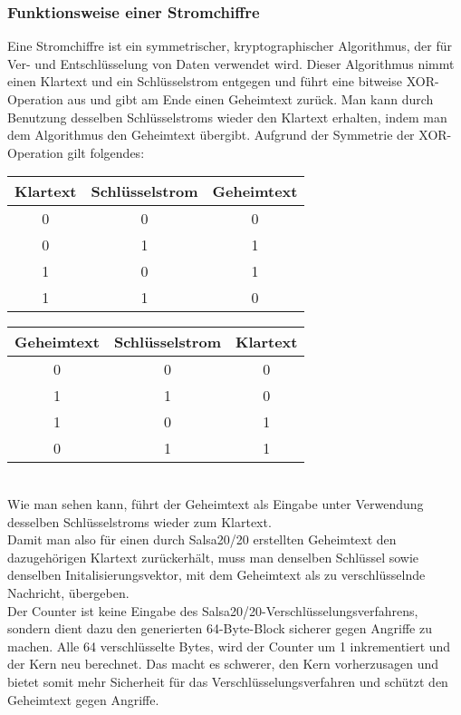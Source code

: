 \documentclass[course=erap]{aspdoc}
\begin{document}
\subsubsection{Funktionsweise einer Stromchiffre} \label{streamcipher}
Eine Stromchiffre ist ein symmetrischer, kryptographischer Algorithmus, der für Ver- und Entschlüsselung von Daten verwendet wird.
Dieser Algorithmus nimmt einen Klartext und ein Schlüsselstrom entgegen und führt eine bitweise XOR-Operation aus und gibt am Ende
einen Geheimtext zurück.
Man kann durch Benutzung desselben Schlüsselstroms wieder den Klartext erhalten, indem man dem Algorithmus den Ge\-heim\-text übergibt.
Aufgrund der Symmetrie der XOR-Operation gilt folgendes:
\begin{table}[!h]
    \begin{tabular}{|c|c|c|}
        \hline
        Klartext & Schlüsselstrom & Geheimtext \\
        \hline
        0        & 0              & 0          \\
        0        & 1              & 1          \\
        1        & 0              & 1          \\
        1        & 1              & 0          \\
        \hline
    \end{tabular}
    \begin{tabular}{|c|c|c|}
        \hline
        Geheimtext & Schlüsselstrom & Klartext \\
        \hline
        0          & 0              & 0        \\
        1          & 1              & 0        \\
        1          & 0              & 1        \\
        0          & 1              & 1        \\
        \hline
    \end{tabular}
\end{table}
\\
Wie man sehen kann, führt der Geheimtext als Eingabe unter Verwendung desselben Schlüsselstroms wieder zum Klartext.
\\
Damit man also für einen durch Salsa20/20 erstellten Geheimtext den dazugehörigen Klartext zurückerhält,
muss man denselben Schlüssel sowie denselben Initalisierungs\-vektor, mit dem Geheimtext als zu verschlüsselnde Nachricht, übergeben.
\\
Der Counter ist keine Eingabe des Salsa20/20-Verschlüsselungsverfahrens, sondern dient dazu den generierten 64-Byte-Block sicherer gegen Angriffe zu machen. 
Alle 64 verschlüsselte Bytes, wird der Counter um 1 inkrementiert und der Kern neu berechnet. Das macht es schwerer, den Kern vorherzusagen und bietet somit mehr Sicherheit für das Verschlüsselungsverfahren und schützt den Geheimtext gegen Angriffe.
\end{document}
